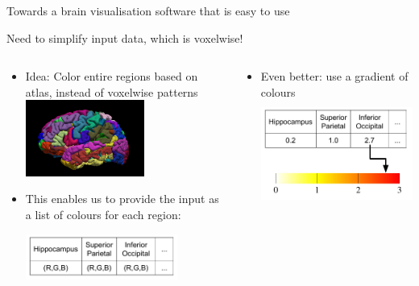 \documentclass[10pt,xcolor=table,aspectratio=169]{beamer}
\begin{document}
\begin{frame}{Towards a brain visualisation software that is easy to use}

\vspace{-1em}
 Need to simplify input data, which is voxelwise!
 
 \begin{columns}[t]
 \begin{column}[t]{0.5\textwidth}
  \begin{itemize}
 \item Idea: Color entire regions based on atlas, instead of voxelwise patterns
 \vspace{1em}
 \includegraphics[height=2.5cm]{images/destrieux}

  \item This enables us to provide the input as a list of colours for each region:

  \vspace{0.5em}
    \includegraphics[height=1.5cm]{images/BrainPainter_gradient_colours_simple}


\end{itemize}
 \end{column}
  \begin{column}[t]{0.5\textwidth}

\begin{itemize}
  \item Even better: use a gradient of colours
   \vspace{3em}
  \includegraphics[height=3.5cm]{images/BrainPainter_gradient_colours}


\end{itemize}
\end{column}
\end{columns}
\end{frame}
\end{document}

